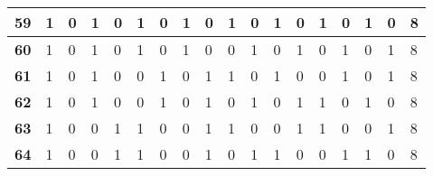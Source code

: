 \begin{center}
\begin{longtable}{|P{0.3cm}|P{0.3cm}|P{0.3cm}|P{0.3cm}|P{0.3cm}|P{0.3cm}|P{0.3cm}|P{0.3cm}|P{0.3cm}|P{0.3cm}|P{0.3cm}|P{0.3cm}|P{0.3cm}|P{0.3cm}|P{0.3cm}|P{0.3cm}|P{0.3cm}|P{1.4cm}|}
\textbf{59}                        & 1                     & 0                     & 1                     & 0                     & 1                     & 0                     & 1                     & 0                     & 1                     & 0                     & 1                     & 0                     & 1                     & 0                     & 1                     & 0                     & 8                     \\ \hline
\textbf{60}                        & 1                     & 0                     & 1                     & 0                     & 1                     & 0                     & 1                     & 0                     & 0                     & 1                     & 0                     & 1                     & 0                     & 1                     & 0                     & 1                     & 8                     \\ \hline
\textbf{61}                        & 1                     & 0                     & 1                     & 0                     & 0                     & 1                     & 0                     & 1                     & 1                     & 0                     & 1                     & 0                     & 0                     & 1                     & 0                     & 1                     & 8                     \\ \hline
\textbf{62}                        & 1                     & 0                     & 1                     & 0                     & 0                     & 1                     & 0                     & 1                     & 0                     & 1                     & 0                     & 1                     & 1                     & 0                     & 1                     & 0                     & 8                     \\ \hline
\textbf{63}                        & 1                     & 0                     & 0                     & 1                     & 1                     & 0                     & 0                     & 1                     & 1                     & 0                     & 0                     & 1                     & 1                     & 0                     & 0                     & 1                     & 8                     \\ \hline
\textbf{64}                        & 1                     & 0                     & 0                     & 1                     & 1                     & 0                     & 0                     & 1                     & 0                     & 1                     & 1                     & 0                     & 0                     & 1                     & 1                     & 0                     & 8                     \\ \hline

\end{longtable}
\end{center}
